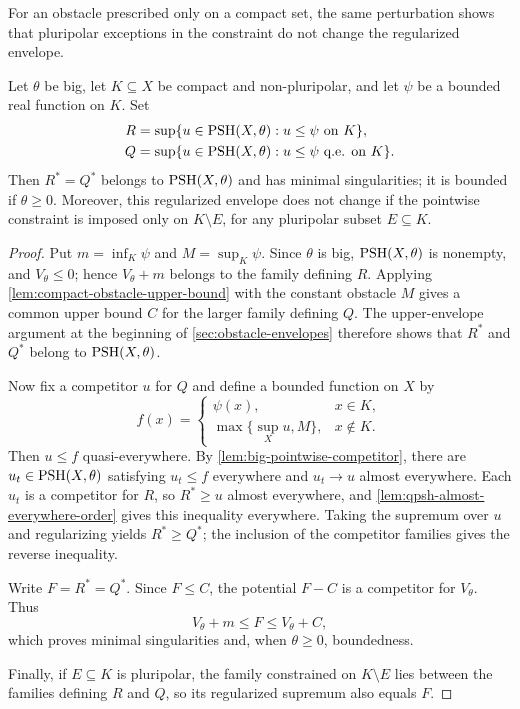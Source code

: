 For an obstacle prescribed only on a compact set, the same perturbation shows that pluripolar exceptions in the constraint do not change the regularized envelope.

\begin{proposition}\label{prop:compact-obstacle-polar-invariance}
Let $\theta$ be big, let $K\subseteq X$ be compact and non-pluripolar, and let $\psi$ be a bounded real function on $K$. Set
\[
 \begin{aligned}
 R&=\sup\{u\in\mathrm{PSH}(X,\theta):u\leq\psi\text{ on }K\},\\
 Q&=\sup\{u\in\mathrm{PSH}(X,\theta):u\leq\psi\text{ q.e. on }K\}.
 \end{aligned}
\]
Then $R^*=Q^*$ belongs to $\mathrm{PSH}(X,\theta)$ and has minimal singularities; it is bounded if $\theta\geq0$. Moreover, this regularized envelope does not change if the pointwise constraint is imposed only on $K\setminus E$, for any pluripolar subset $E\subseteq K$.
\end{proposition}
\begin{proof}
Put $m=\inf_K\psi$ and $M=\sup_K\psi$. Since $\theta$ is big, $\mathrm{PSH}(X,\theta)$ is nonempty, and $V_\theta\leq0$; hence $V_\theta+m$ belongs to the family defining $R$. Applying \cref{lem:compact-obstacle-upper-bound} with the constant obstacle $M$ gives a common upper bound $C$ for the larger family defining $Q$. The upper-envelope argument at the beginning of \cref{sec:obstacle-envelopes} therefore shows that $R^*$ and $Q^*$ belong to $\mathrm{PSH}(X,\theta)$.

Now fix a competitor $u$ for $Q$ and define a bounded function on $X$ by
\[
 f(x)=
 \begin{cases}
 \psi(x),&x\in K,\\
 \max\{\sup_Xu,M\},&x\notin K.
 \end{cases}
\]
Then $u\leq f$ quasi-everywhere. By \cref{lem:big-pointwise-competitor}, there are $u_t\in\mathrm{PSH}(X,\theta)$ satisfying $u_t\leq f$ everywhere and $u_t\to u$ almost everywhere. Each $u_t$ is a competitor for $R$, so $R^*\geq u$ almost everywhere, and \cref{lem:qpsh-almost-everywhere-order} gives this inequality everywhere. Taking the supremum over $u$ and regularizing yields $R^*\geq Q^*$; the inclusion of the competitor families gives the reverse inequality.

Write $F=R^*=Q^*$. Since $F\leq C$, the potential $F-C$ is a competitor for $V_\theta$. Thus
\[
 V_\theta+m\leq F\leq V_\theta+C,
\]
which proves minimal singularities and, when $\theta\geq0$, boundedness.

Finally, if $E\subseteq K$ is pluripolar, the family constrained on $K\setminus E$ lies between the families defining $R$ and $Q$, so its regularized supremum also equals $F$.
\end{proof}
